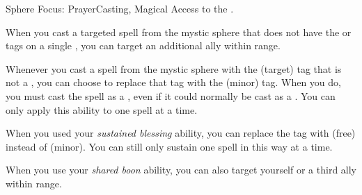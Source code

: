   \begin{magicalfeat}{Sphere Focus: Prayer}{Casting, Magical}
    \featpre Access to the  .

     When you cast a targeted spell from the  mystic sphere that does not have the  or  tags on a single , you can target an additional ally within range.

     Whenever you cast a spell from the  mystic sphere with the  (target) tag that is not a , you can choose to replace that tag with the  (minor) tag.
    When you do, you must cast the spell as a , even if it could normally be cast as a .
    You can only apply this ability to one spell at a time.

     When you used your \textit{sustained blessing} ability, you can replace the tag with  (free) instead of  (minor).
    You can still only sustain one spell in this way at a time.

     When you use your \textit{shared boon} ability, you can also target yourself or a third ally within range.
  \end{magicalfeat}

